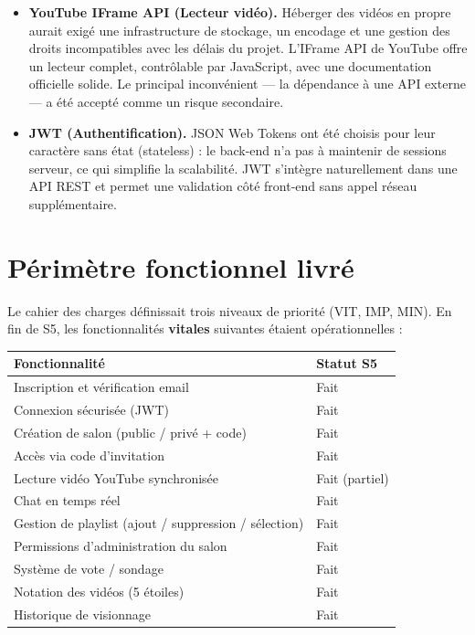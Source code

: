 \documentclass[11pt,a4paper]{report}
\begin{document}
\begin{itemize}
    \item \textbf{YouTube IFrame API (Lecteur vidéo).}
    Héberger des vidéos en propre aurait exigé une infrastructure de stockage, un encodage et une gestion des droits incompatibles avec les délais du projet. L'IFrame API de YouTube offre un lecteur complet, contrôlable par JavaScript, avec une documentation officielle solide. Le principal inconvénient --- la dépendance à une API externe --- a été accepté comme un risque secondaire.

    \item \textbf{JWT (Authentification).}
    JSON Web Tokens ont été choisis pour leur caractère sans état (stateless) : le back-end n'a pas à maintenir de sessions serveur, ce qui simplifie la scalabilité. JWT s'intègre naturellement dans une API REST et permet une validation côté front-end sans appel réseau supplémentaire.
\end{itemize}

\section{Périmètre fonctionnel livré}

Le cahier des charges définissait trois niveaux de priorité (VIT, IMP, MIN). En fin de S5, les fonctionnalités \textbf{vitales} suivantes étaient opérationnelles :

\begin{longtable}{L{0.55\textwidth} C{0.20\textwidth}}
\toprule
{}
\textbf{Fonctionnalité} & \textbf{Statut S5} \\
\midrule
Inscription et vérification email & Fait \\
Connexion sécurisée (JWT) & Fait \\
Création de salon (public / privé + code) & Fait \\
Accès via code d'invitation & Fait \\
Lecture vidéo YouTube synchronisée & Fait (partiel) \\
Chat en temps réel & Fait \\
Gestion de playlist (ajout / suppression / sélection) & Fait \\
Permissions d'administration du salon & Fait \\
Système de vote / sondage & Fait \\
Notation des vidéos (5 étoiles) & Fait \\
Historique de visionnage & Fait \\
\bottomrule
\end{longtable}
\end{document}
